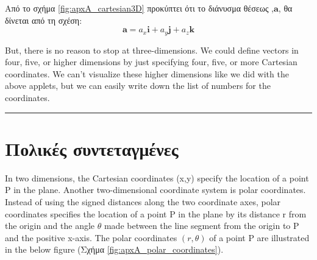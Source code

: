 Από το σχήμα \ref{fig:apxA_cartesian3D} προκύπτει ότι το διάνυσμα θέσεως ,$\boldsymbol{a}$, θα δίνεται από τη σχέση: $$\boldsymbol{a} = a_x \boldsymbol{i} + a_y \boldsymbol{j} + a_z \boldsymbol{k}$$

But, there is no reason to stop at three-dimensions. We could define vectors in four, five, or higher dimensions by just specifying four, five, or more Cartesian coordinates. We can't visualize these higher dimensions like we did with the above applets, but we can easily write down the list of numbers for the coordinates.\\
{\color{red} \hrule}


\section{Πολικές συντεταγμένες}
In two dimensions, the Cartesian coordinates (x,y) specify the location of a point P in the plane. Another two-dimensional coordinate system is polar coordinates. Instead of using the signed distances along the two coordinate axes, polar coordinates specifies the location of a point P in the plane by its distance r from the origin and the angle $\theta$ made between the line segment from the origin to P and the positive x-axis. The polar coordinates $(r, \theta)$ of a point P are illustrated in the below figure (Σχήμα \ref{fig:apxA_polar_coordinates}).

